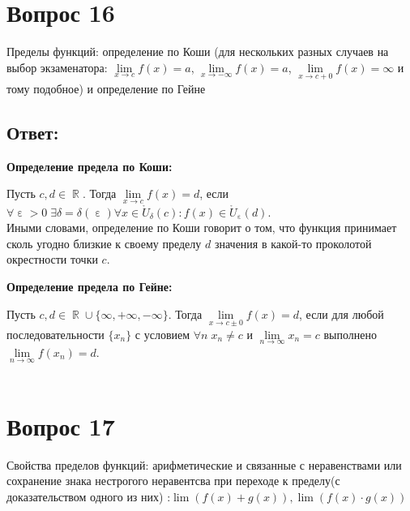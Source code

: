 \documentclass{article}
\DeclareMathOperator{\Exists}{\exists}
\DeclareMathOperator{\eps}{\varepsilon}
\DeclareMathOperator{\Forall}{\forall}
\DeclareMathOperator{\re}{\mathbb{R}}
\begin{document}
\section*{Вопрос 16}
\begin{center}
Пределы функций: определение по Коши (для нескольких разных случаев на выбор экзаменатора: $\lim\limits_{x\to c}f(x)=a$, $\lim\limits_{x\to -\infty}f(x)=a$, $\lim\limits_{x\to c+0}f(x)=\infty$ и тому подобное) и определение по Гейне
\end{center}
\subsection*{Ответ:}
\textbf{Определение предела по Коши:}
 
     Пусть $ c, d\in\re$. Тогда $\lim\limits_{x\to c} f(x) = d $, если $\Forall\eps > 0\; \Exists\delta = \delta(\eps) \Forall x\in \mathring{U}_{\delta}(c)\colon f(x)\in\mathring{U}_{\eps}(d)$.\\
     Иными словами, определение по Коши говорит о том, что функция принимает сколь угодно близкие к
     своему пределу $d$ значения в какой-то проколотой окрестности точки $c$.
 
\begin{figure}[H]
\end{figure}
\textbf{Определение предела по Гейне:}
 
     Пусть  $c, d\in\re\cup\{\infty, +\infty, -\infty\}$. Тогда $\lim\limits_{x\to c\pm 0} f(x) = d$, если для любой последовательности $\{x_n\}$ с условием $\Forall n\; x_n \neq c$ и $\lim\limits_{n\to\infty} x_n = c$ выполнено $\lim\limits_{n\to\infty} f(x_n) = d$.\\\\
     
\section*{Вопрос 17}
\begin{center}
  Свойства пределов функций: арифметические и связанные с неравенствами или сохранение знака нестрогого неравентсва при переходе к пределу(с доказательством одного из них) :$\lim(f(x)+g(x)), \lim(f(x)\cdot g(x))$
\end{center}
\end{document}

